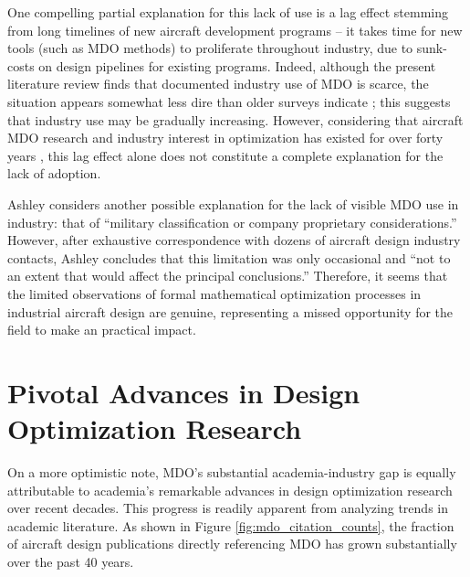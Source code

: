 One compelling partial explanation for this lack of use is a lag effect stemming from long timelines of new aircraft development programs -- it takes time for new tools (such as MDO methods) to proliferate throughout industry, due to sunk-costs on design pipelines for existing programs. Indeed, although the present literature review finds that documented industry use of MDO is scarce, the situation appears somewhat less dire than older surveys indicate \cite{kroo_multidisciplinary_1997, agte_mdo_2010, ashley_making_1982, haftka_multidisciplinary_1997, gazaix_industrialization_2017}; this suggests that industry use may be gradually increasing. However, considering that aircraft MDO research and industry interest in optimization has existed for over forty years \cite{vanderplaats_automated_1976, ashley_making_1982}, this lag effect alone does not constitute a complete explanation for the lack of adoption.

Ashley considers another possible explanation for the lack of visible MDO use in industry: that of ``military classification or company proprietary considerations.'' \cite{ashley_making_1982} However, after exhaustive correspondence with dozens of aircraft design industry contacts, Ashley concludes that this limitation was only occasional and ``not to an extent that would affect the principal conclusions.'' Therefore, it seems that the limited observations of formal mathematical optimization processes in industrial aircraft design are genuine, representing a missed opportunity for the field to make an practical impact.


\section{Pivotal Advances in Design Optimization Research}
\label{sec:literature_advances}

On a more optimistic note, MDO's substantial academia-industry gap is equally attributable to academia's remarkable advances in design optimization research over recent decades. This progress is readily apparent from analyzing trends in academic literature. As shown in Figure \ref{fig:mdo_citation_counts}, the fraction of aircraft design publications directly referencing MDO has grown substantially over the past 40 years.

